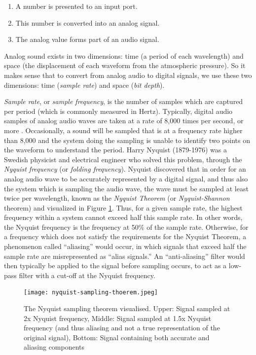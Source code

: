 \begin{enumerate}
	\item A number is presented to an input port.
	\item This number is converted into an analog signal.
	\item The analog value forms part of an audio signal.
\end{enumerate}

Analog sound exists in two dimensions: time (a period of each wavelength) and space (the displacement of each waveform from the atmospheric pressure). So it makes sense that to convert from analog audio to digital signals, we use these two dimensions: time (\textit{sample rate}) and space (\textit{bit depth}). 

\textit{Sample rate}, or \textit{sample frequency}, is the number of samples which are captured per period (which is commonly measured in Hertz). Typically, digital audio samples of analog audio waves are taken at a rate of 8,000 times per second, or more \cite{Zjalic_2021}. Occasionally, a sound will be sampled that is at a frequency rate higher than 8,000 and the system doing the sampling is unable to identify two points on the waveform to understand the period. Harry Nyquist (1879-1976) was a Swedish physicist and electrical engineer who solved this problem, through the \textit{Nyquist frequency} (or \textit{folding frequency}). Nyquist discovered that in order for an analog audio wave to be accurately represented by a digital signal, and thus also the system which is sampling the audio wave, the wave must be sampled at least twice per wavelength, known as the \textit{Nyquist Theorem} (or \textit{Nyquist-Shannon} theorem) \cite{Zjalic_2021} and visualized in Figure \ref{fig:nyquist-sampling-theorem}. Thus, for a given sample rate, the highest frequency within a system cannot exceed half this sample rate. In other words, the Nyquist frequency is the frequency at 50\% of the sample rate. Otherwise, for a frequency which does not satisfy the requirements for the Nyquist Theorem, a phenomenon called ``aliasing'' would occur, in which signals that exceed half the sample rate are misrepresented as ``alias signals.'' An ``anti-aliasing'' filter would then typically be applied to the signal before sampling occurs, to act as a low-pass filter with a cut-off at the Nyquist frequency. 

\begin{figure}[H]
  \centering
  \texttt{[image: nyquist-sampling-thoerem.jpeg]}
  \caption{The Nyquist sampling theorem visualised. Upper: Signal sampled at 2x Nyquist frequency, Middle: Signal sampled at 1.5x Nyquist frequency (and thus aliasing and not a true representation of the original signal), Bottom: Signal containing both accurate and aliasing components}\cite{Zjalic_2021}
  \label{fig:nyquist-sampling-theorem}
\end{figure}

